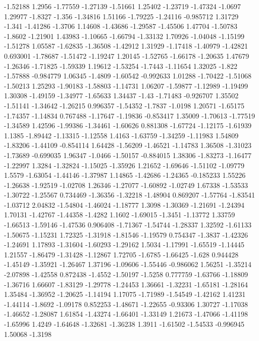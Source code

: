 \documentclass[9pt]{article}
\theoremstyle{plain}
\theoremstyle{definition}
\theoremstyle{remark}
\numberwithin{equation}{section}
\begin{document}
-1.52188
1.2956
-1.77559
-1.27139
-1.51661
1.25402
-1.23719
-1.47324
-1.0697
1.29977
-1.8327
-1.356
-1.34816
1.51166
-1.79225
-1.24116
-0.985712
1.31729
-1.341
-1.41286
-1.3706
1.14608
-1.43686
-1.29587
-1.45506
1.47704
-1.50783
-1.8602
-1.21901
1.43983
-1.10665
-1.66794
-1.33132
1.70926
-1.04048
-1.15199
-1.51278
1.05587
-1.62835
-1.36508
-1.42912
1.31929
-1.17418
-1.40979
-1.42821
0.693001
-1.78687
-1.51472
-1.19247
1.20145
-1.52765
-1.66178
-1.20635
1.47679
-1.26346
-1.71825
-1.59339
1.19612
-1.53254
-1.7443
-1.11654
1.32025
-1.822
-1.57888
-0.984779
1.06345
-1.4809
-1.60542
-0.992633
1.01288
-1.70422
-1.51068
-1.50213
1.25293
-1.90183
-1.58803
-1.14731
1.06207
-1.59877
-1.12989
-1.19499
1.30308
-1.49159
-1.34977
-1.65633
1.34437
-1.43
-1.71483
-0.926707
1.35502
-1.51141
-1.34642
-1.26215
0.996357
-1.54352
-1.7837
-1.0198
1.20571
-1.65175
-1.74357
-1.14834
0.767488
-1.17647
-1.19836
-0.853417
1.35009
-1.70613
-1.77519
-1.34589
1.42596
-1.99386
-1.34461
-1.60626
0.881308
-1.67724
-1.12175
-1.61939
1.1385
-1.89442
-1.13315
-1.12558
1.4163
-1.63759
-1.34259
-1.11983
1.54809
-1.83206
-1.44109
-0.854114
1.64428
-1.56209
-1.46521
-1.14783
1.36508
-1.31023
-1.73689
-0.699035
1.96347
-1.0466
-1.50157
-0.884015
1.38306
-1.83273
-1.16477
-1.22997
1.3284
-1.32824
-1.15025
-1.35926
1.21652
-1.69646
-1.51102
-1.09779
1.5579
-1.63054
-1.44146
-1.37987
1.14865
-1.42686
-1.24365
-0.185233
1.55226
-1.26638
-1.92519
-1.02708
1.26346
-1.27077
-1.60892
-1.02749
1.67338
-1.53533
-1.30722
-1.25567
0.734469
-1.36356
-1.32218
-1.48904
0.869207
-1.57764
-1.83541
-1.03712
2.04832
-1.54804
-1.46024
-1.18777
1.3098
-1.30369
-1.21691
-1.24394
1.70131
-1.42767
-1.44358
-1.4282
1.1602
-1.69015
-1.3451
-1.13772
1.33759
-1.66513
-1.59146
-1.47536
0.906408
-1.71367
-1.54744
-1.28337
1.32592
-1.61133
-1.50675
-1.15231
1.72325
-1.31918
-1.81546
-1.19579
0.754347
-1.3837
-1.42326
-1.24691
1.17893
-1.31604
-1.60293
-1.29162
1.5034
-1.17991
-1.65519
-1.14445
1.21557
-1.86479
-1.31428
-1.12867
1.72705
-1.6785
-1.66425
-1.628
0.944428
-1.45149
-1.35921
-1.26467
1.37196
-1.09606
-1.55446
-0.986062
1.56251
-1.35214
-2.07898
-1.42558
0.872438
-1.4552
-1.50197
-1.5258
0.777759
-1.63766
-1.18809
-1.36716
1.66607
-1.83129
-1.29778
-1.24453
1.36661
-1.32231
-1.65181
-1.28164
1.35484
-1.36952
-1.20625
-1.14194
1.17075
-1.71989
-1.54549
-1.42162
1.41231
-1.44114
-1.8692
-1.09178
0.852253
-1.48671
-1.22655
-0.93306
1.30727
-1.17038
-1.46652
-1.28087
1.61854
-1.43274
-1.66401
-1.33149
1.21673
-1.47066
-1.41198
-1.65996
1.4249
-1.64648
-1.32681
-1.36238
1.3911
-1.61502
-1.54533
-0.996945
1.50068
-1.3198
\end{document}
